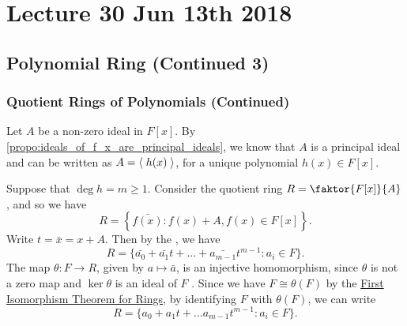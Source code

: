 \chapter{Lecture 30 Jun 13th 2018}%
\label{chp:lecture_30_jun_13th_2018}

\section{Polynomial Ring (Continued 3)}%
\label{sec:polynomial_ring_continued_3}

\subsection{Quotient Rings of Polynomials (Continued)}%
\label{sub:quotient_rings_of_polynomials_continued}

Let $A$ be a non-zero ideal in $F[x]$. By \cref{propo:ideals_of_f_x_are_principal_ideals}, we know that $A$ is a principal ideal and can be written as $A = \langle \; h(x) \; \rangle$, for a unique polynomial $h(x) \in F[x]$.

Suppose that $\deg h = m \geq 1$. Consider the quotient ring $R = \faktor{F[x]}{A}$, and so we have
\begin{equation*}
  R = \left\{ \bar{f(x)} : f(x) + A, f(x) \in F[x] \right\}.
\end{equation*}
Write $t = \bar{x} = x + A$. Then by the , we have
\begin{equation*}
  R = \{ \bar{a_0} + \bar{a_1} t + \hdots + \bar{a_{m - 1}} t^{m - 1} : a_i \in F \}.
\end{equation*}
The map $\theta : F \to R$, given by $a \mapsto \bar{a}$, is an injective homomorphism, since $\theta$ is not a zero map and $\ker \theta$ is an ideal of $F$ . Since we have $F \cong \theta(F)$ by the \hyperref[thm:first_isomorphism_theorem_for_rings]{First Isomorphism Theorem for Rings}, by identifying $F$ with $\theta(F)$, we can write
\begin{equation*}
  R = \{ a_0 + a_1 t + \hdots a_{m - 1} t^{m - 1} : a_i \in F \}.
\end{equation*}

